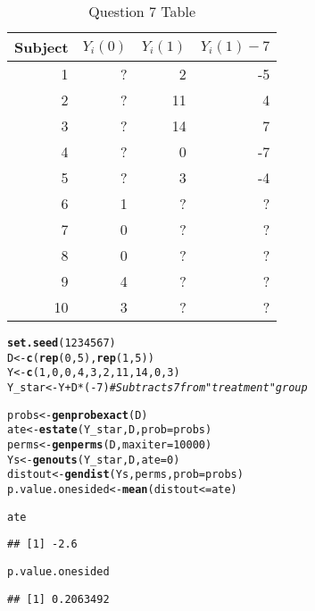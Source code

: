 \documentclass[11pt,notitlepage]{article}\usepackage[]{graphicx}\usepackage[]{color}
\makeatletter
\newcommand{\hlnum}[1]{\textcolor[rgb]{0.686,0.059,0.569}{#1}}%
\newcommand{\hlcom}[1]{\textcolor[rgb]{0.678,0.584,0.686}{\textit{#1}}}%
\newcommand{\hlopt}[1]{\textcolor[rgb]{0,0,0}{#1}}%
\newcommand{\hlstd}[1]{\textcolor[rgb]{0.345,0.345,0.345}{#1}}%
\newcommand{\hlkwb}[1]{\textcolor[rgb]{0.69,0.353,0.396}{#1}}%
\newcommand{\hlkwc}[1]{\textcolor[rgb]{0.333,0.667,0.333}{#1}}%
\newcommand{\hlkwd}[1]{\textcolor[rgb]{0.737,0.353,0.396}{\textbf{#1}}}%
\newenvironment{kframe}{%
 \def\at@end@of@kframe{}%
 \ifinner\ifhmode%
  \def\at@end@of@kframe{\end{minipage}}%
  \begin{minipage}{\columnwidth}%
 \fi\fi%
 \def\FrameCommand##1{\hskip\@totalleftmargin \hskip-\fboxsep
 \colorbox{shadecolor}{##1}\hskip-\fboxsep
     \hskip-\linewidth \hskip-\@totalleftmargin \hskip\columnwidth}%
 \MakeFramed {\advance\hsize-\width
   \@totalleftmargin\z@ \linewidth\hsize
   \@setminipage}}%
 {\par\unskip\endMakeFramed%
 \at@end@of@kframe}
\newenvironment{knitrout}{}{} %
\makeatother
\begin{document}
\begin{table}[htbp]
  \centering
  \caption{Question 7 Table}
    \begin{tabular}{rrrr}
    \toprule
     Subject & $Y_i(0)$      & $Y_i(1)$       & $Y_i(1) - 7$  \\
    \midrule
    1     &   ?    &   2    &  -5 \\
    2     &   ?    &  11     &  4 \\
    3     &   ?    &  14     &  7 \\
    4     &   ?    &  0     &   -7\\
    5     &   ?    &  3     &   -4\\
    6     &   1    &  ?     &   ?\\
    7     &   0    &  ?     & ?  \\
    8     &   0    &  ?     & ?  \\
    9     &   4    &  ?     & ?  \\
    10    &   3    &  ?     & ? \\
    \bottomrule
    \end{tabular}%
  \label{tab:addlabel}%
\end{table}

\begin{knitrout}
\color{fgcolor}\begin{kframe}
\begin{alltt}
\hlkwd{set.seed}\hlstd{(}\hlnum{1234567}\hlstd{)}
\hlstd{D} \hlkwb{<-} \hlkwd{c}\hlstd{(}\hlkwd{rep}\hlstd{(}\hlnum{0}\hlstd{,}\hlnum{5}\hlstd{),} \hlkwd{rep}\hlstd{(}\hlnum{1}\hlstd{,} \hlnum{5}\hlstd{))}
\hlstd{Y} \hlkwb{<-} \hlkwd{c}\hlstd{(}\hlnum{1}\hlstd{,}\hlnum{0}\hlstd{,}\hlnum{0}\hlstd{,}\hlnum{4}\hlstd{,}\hlnum{3}\hlstd{,}\hlnum{2}\hlstd{,}\hlnum{11}\hlstd{,}\hlnum{14}\hlstd{,}\hlnum{0}\hlstd{,}\hlnum{3}\hlstd{)}
\hlstd{Y_star} \hlkwb{<-} \hlstd{Y} \hlopt{+} \hlstd{D}\hlopt{*}\hlstd{(}\hlopt{-}\hlnum{7}\hlstd{)}   \hlcom{# Subtracts 7 from "treatment" group}

\hlstd{probs} \hlkwb{<-} \hlkwd{genprobexact}\hlstd{(D)}
\hlstd{ate} \hlkwb{<-} \hlkwd{estate}\hlstd{(Y_star,D,}\hlkwc{prob}\hlstd{=probs)}
\hlstd{perms} \hlkwb{<-} \hlkwd{genperms}\hlstd{(D,}\hlkwc{maxiter}\hlstd{=}\hlnum{10000}\hlstd{)}
\hlstd{Ys} \hlkwb{<-} \hlkwd{genouts}\hlstd{(Y_star,D,}\hlkwc{ate}\hlstd{=}\hlnum{0}\hlstd{)}
\hlstd{distout} \hlkwb{<-} \hlkwd{gendist}\hlstd{(Ys,perms,}\hlkwc{prob}\hlstd{=probs)}
\hlstd{p.value.onesided} \hlkwb{<-} \hlkwd{mean}\hlstd{(distout}\hlopt{<=}\hlstd{ate)}

\hlstd{ate}
\end{alltt}
\begin{verbatim}
## [1] -2.6
\end{verbatim}
\begin{alltt}
\hlstd{p.value.onesided}
\end{alltt}
\begin{verbatim}
## [1] 0.2063492
\end{verbatim}
\end{kframe}
\end{knitrout}
\end{document}
